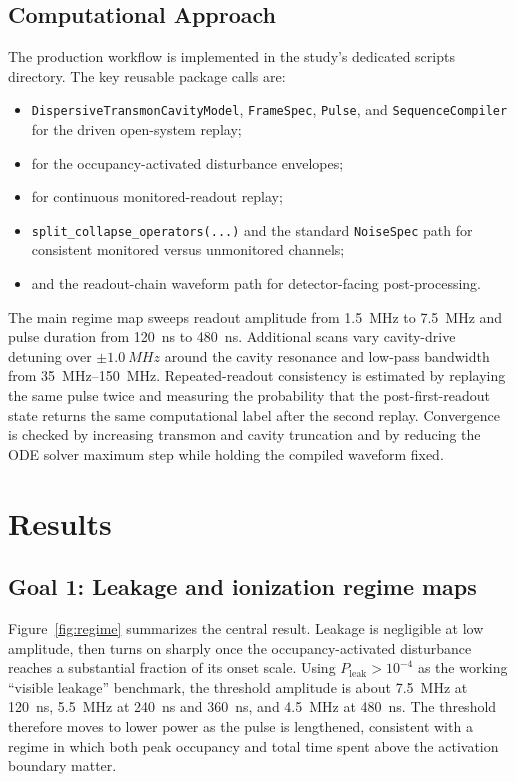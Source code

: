 \documentclass[11pt, a4paper]{article}
\begin{document}
\subsection{Computational Approach}
The production workflow is implemented in the study's dedicated scripts directory.
The key reusable package calls are:
\begin{itemize}
  \item \texttt{DispersiveTransmonCavityModel}, \texttt{FrameSpec}, \texttt{Pulse}, and \texttt{SequenceCompiler} for the driven open-system replay;
  \item {} for the occupancy-activated disturbance envelopes;
  \item {} for continuous monitored-readout replay;
  \item \texttt{split\_collapse\_operators(...)} and the standard \texttt{NoiseSpec} path for consistent monitored versus unmonitored channels;
  \item and the readout-chain waveform path for detector-facing post-processing.
\end{itemize}

The main regime map sweeps readout amplitude from \SI{1.5}{MHz} to \SI{7.5}{MHz} and pulse duration from \SI{120}{ns} to \SI{480}{ns}. Additional scans vary cavity-drive detuning over $\pm\SI{1.0}{MHz}$ around the cavity resonance and low-pass bandwidth from \SIrange{35}{150}{MHz}. Repeated-readout consistency is estimated by replaying the same pulse twice and measuring the probability that the post-first-readout state returns the same computational label after the second replay. Convergence is checked by increasing transmon and cavity truncation and by reducing the ODE solver maximum step while holding the compiled waveform fixed.

\section{Results}

\subsection{Goal 1: Leakage and ionization regime maps}
Figure~\ref{fig:regime} summarizes the central result. Leakage is negligible at low amplitude, then turns on sharply once the occupancy-activated disturbance reaches a substantial fraction of its onset scale. Using
$P_{\mathrm{leak}} > 10^{-4}$
as the working ``visible leakage'' benchmark, the threshold amplitude is about \SI{7.5}{MHz} at \SI{120}{ns}, \SI{5.5}{MHz} at \SI{240}{ns} and \SI{360}{ns}, and \SI{4.5}{MHz} at \SI{480}{ns}. The threshold therefore moves to lower power as the pulse is lengthened, consistent with a regime in which both peak occupancy and total time spent above the activation boundary matter.
\end{document}

